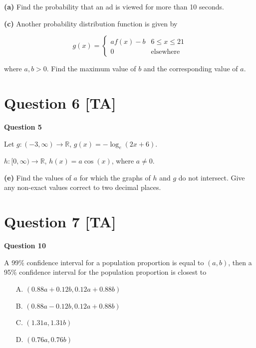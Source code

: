 \documentclass[12pt,a4paper]{article}
\begin{document}
\textbf{(a)} Find the probability that an ad is viewed for more than 10 seconds.

\vspace{5\baselineskip}

\textbf{(c)} Another probability distribution function is given by

\[
g(x) = \begin{cases}
af(x) - b & 6 \leq x \leq 21 \\
0 & \text{elsewhere}
\end{cases}
\]

where $a, b > 0$. Find the maximum value of $b$ and the corresponding value of $a$.

\vspace{5\baselineskip}

\hrulefill

\section*{Question 6 [TA]}

\textbf{Question 5}

Let $g : (-3,\infty) \to \mathbb{R}$, $g(x) = -\log_e(2x + 6)$.

$h : [0,\infty) \to \mathbb{R}$, $h(x) = a\cos(x)$, where $a \neq 0$.

\textbf{(e)} Find the values of $a$ for which the graphs of $h$ and $g$ do not intersect. Give any non-exact values correct to two decimal places.

\vspace{5\baselineskip}

\hrulefill

\section*{Question 7 [TA]}

\textbf{Question 10}

A 99\% confidence interval for a population proportion is equal to $(a,b)$, then a 95\% confidence interval for the population proportion is closest to

\begin{enumerate}
    \item[A.] $(0.88a + 0.12b, 0.12a + 0.88b)$
    \item[B.] $(0.88a - 0.12b, 0.12a + 0.88b)$
    \item[C.] $(1.31a, 1.31b)$
    \item[D.] $(0.76a, 0.76b)$
\end{enumerate}
\end{document}
